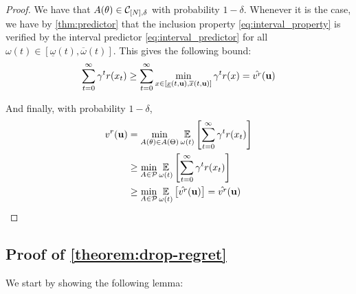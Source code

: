 \documentclass{article}
\begin{document}
\begin{proof}
We have that $A(\theta) \in \mathcal{C}_{[N],\delta}$ with probability $1-\delta$. Whenever it is the case, we have by \autoref{thm:predictor} that the inclusion property \eqref{eq:interval_property} is verified by the interval predictor \eqref{eq:interval_predictor} for all $\omega(t)\in[\underline{\omega}(t), \overline{\omega}(t)]$. This gives the following bound:
\begin{equation*}
 \sum_{t=0}^\infty \gamma^t r(x_t) \geq \sum_{t=0}^\infty \min_{x\in[\underline{x}(t, \mathbf{u}), \overline{x}(t, \mathbf{u})]} \gamma^t r(x) = \hat{v^r}(\mathbf{u})
\end{equation*}

And finally, with probability $1-\delta$,
\begin{align*}
v^r(\mathbf{u}) &= \min_{A(\theta) \in A(\Theta)} \operatorname*{\mathbb{E}}\limits_{\omega(t)}\left[\sum_{t=0}^\infty \gamma^t r(x_t)\right] \\
&\geq \min_{A \in \mathcal{P}} \operatorname*{\mathbb{E}}\limits_{\omega(t)}\left[\sum_{t=0}^\infty \gamma^t r(x_t)\right] \\
& \geq \min_{A \in \mathcal{P}} \operatorname*{\mathbb{E}}\limits_{\omega(t)}\left[\hat{v^r}(\mathbf{u})\right] = \hat{v^r}(\mathbf{u})
\end{align*}
\end{proof}


\subsection{Proof of \autoref{theorem:drop-regret}}

We start by showing the following lemma:
\end{document}
